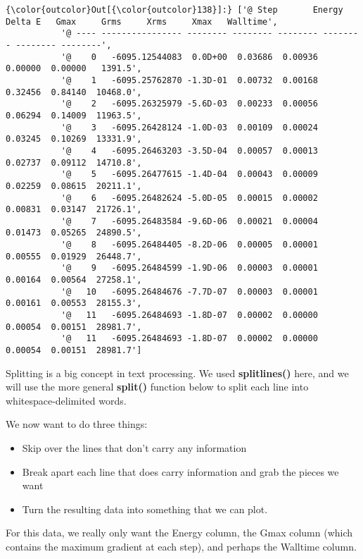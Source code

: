 \documentclass[11pt]{article}
\providecommand{\tightlist}{%
      \setlength{\itemsep}{0pt}\setlength{\parskip}{0pt}}
\begin{document}
\begin{Verbatim}[commandchars=\\\{\}]
{\color{outcolor}Out[{\color{outcolor}138}]:} ['@ Step       Energy      Delta E   Gmax     Grms     Xrms     Xmax   Walltime',
           '@ ---- ---------------- -------- -------- -------- -------- -------- --------',
           '@    0   -6095.12544083  0.0D+00  0.03686  0.00936  0.00000  0.00000   1391.5',
           '@    1   -6095.25762870 -1.3D-01  0.00732  0.00168  0.32456  0.84140  10468.0',
           '@    2   -6095.26325979 -5.6D-03  0.00233  0.00056  0.06294  0.14009  11963.5',
           '@    3   -6095.26428124 -1.0D-03  0.00109  0.00024  0.03245  0.10269  13331.9',
           '@    4   -6095.26463203 -3.5D-04  0.00057  0.00013  0.02737  0.09112  14710.8',
           '@    5   -6095.26477615 -1.4D-04  0.00043  0.00009  0.02259  0.08615  20211.1',
           '@    6   -6095.26482624 -5.0D-05  0.00015  0.00002  0.00831  0.03147  21726.1',
           '@    7   -6095.26483584 -9.6D-06  0.00021  0.00004  0.01473  0.05265  24890.5',
           '@    8   -6095.26484405 -8.2D-06  0.00005  0.00001  0.00555  0.01929  26448.7',
           '@    9   -6095.26484599 -1.9D-06  0.00003  0.00001  0.00164  0.00564  27258.1',
           '@   10   -6095.26484676 -7.7D-07  0.00003  0.00001  0.00161  0.00553  28155.3',
           '@   11   -6095.26484693 -1.8D-07  0.00002  0.00000  0.00054  0.00151  28981.7',
           '@   11   -6095.26484693 -1.8D-07  0.00002  0.00000  0.00054  0.00151  28981.7']
\end{Verbatim}
            
    Splitting is a big concept in text processing. We used
\textbf{splitlines()} here, and we will use the more general
\textbf{split()} function below to split each line into
whitespace-delimited words.

We now want to do three things:

\begin{itemize}
\tightlist
\item
  Skip over the lines that don't carry any information
\item
  Break apart each line that does carry information and grab the pieces
  we want
\item
  Turn the resulting data into something that we can plot.
\end{itemize}

For this data, we really only want the Energy column, the Gmax column
(which contains the maximum gradient at each step), and perhaps the
Walltime column.
\end{document}
